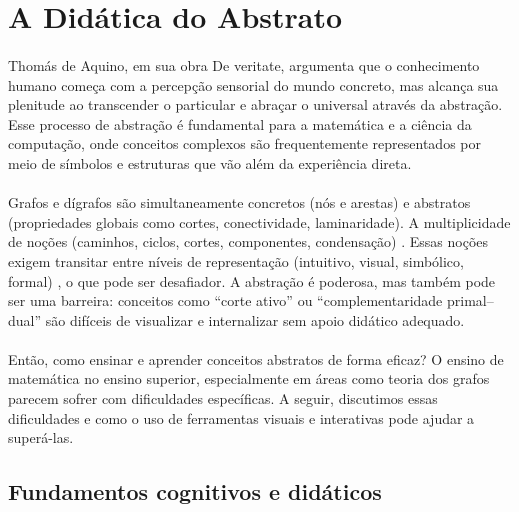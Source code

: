 \documentclass[12pt,a4paper]{article}
\def\emph#1{#1}%
\begin{document}
\section{A Didática do Abstrato}

\paragraph{}
Thomás de Aquino, em sua obra \emph{De veritate}, argumenta que o conhecimento humano começa com a percepção sensorial do mundo concreto, mas alcança sua plenitude ao transcender o particular e abraçar o universal através da abstração. Esse processo de abstração é fundamental para a matemática e a ciência da computação, onde conceitos complexos são frequentemente representados por meio de símbolos e estruturas que vão além da experiência direta.

\paragraph{}
Grafos e dígrafos são simultaneamente concretos (nós e arestas) e abstratos (propriedades globais como cortes, conectividade, laminaridade). A multiplicidade de noções (caminhos, ciclos, cortes, componentes, condensação) \cite{bondy2008graph,diestel2017graph,west2001introduction}. Essas noções exigem transitar entre níveis de representação (intuitivo, visual, simbólico, formal) \cite{tall1991advanced}, o que pode ser desafiador. A abstração é poderosa, mas também pode ser uma barreira: conceitos como “corte ativo” ou “complementaridade primal–dual” são difíceis de visualizar e internalizar sem apoio didático adequado.

\paragraph{}
Então, como ensinar e aprender conceitos abstratos de forma eficaz? O ensino de matemática no ensino superior, especialmente em áreas como teoria dos grafos parecem sofrer com dificuldades específicas. A seguir, discutimos essas dificuldades e como o uso de ferramentas visuais e interativas pode ajudar a superá-las.

\subsection{Fundamentos cognitivos e didáticos}
\end{document}
